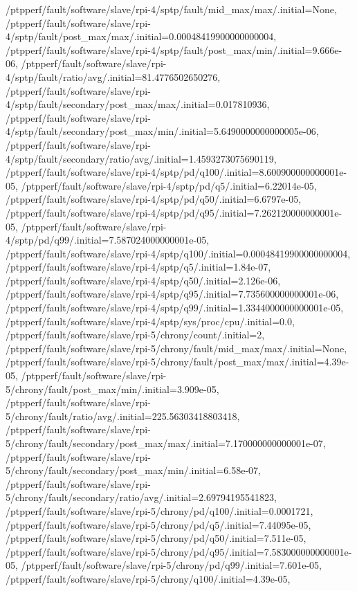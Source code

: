 {    /ptpperf/fault/software/slave/rpi-4/sptp/fault/mid_max/max/.initial=None,
    /ptpperf/fault/software/slave/rpi-4/sptp/fault/post_max/max/.initial=0.00048419900000000004,
    /ptpperf/fault/software/slave/rpi-4/sptp/fault/post_max/min/.initial=9.666e-06,
    /ptpperf/fault/software/slave/rpi-4/sptp/fault/ratio/avg/.initial=81.4776502650276,
    /ptpperf/fault/software/slave/rpi-4/sptp/fault/secondary/post_max/max/.initial=0.017810936,
    /ptpperf/fault/software/slave/rpi-4/sptp/fault/secondary/post_max/min/.initial=5.6490000000000005e-06,
    /ptpperf/fault/software/slave/rpi-4/sptp/fault/secondary/ratio/avg/.initial=1.4593273075690119,
    /ptpperf/fault/software/slave/rpi-4/sptp/pd/q100/.initial=8.600900000000001e-05,
    /ptpperf/fault/software/slave/rpi-4/sptp/pd/q5/.initial=6.22014e-05,
    /ptpperf/fault/software/slave/rpi-4/sptp/pd/q50/.initial=6.6797e-05,
    /ptpperf/fault/software/slave/rpi-4/sptp/pd/q95/.initial=7.262120000000001e-05,
    /ptpperf/fault/software/slave/rpi-4/sptp/pd/q99/.initial=7.587024000000001e-05,
    /ptpperf/fault/software/slave/rpi-4/sptp/q100/.initial=0.00048419900000000004,
    /ptpperf/fault/software/slave/rpi-4/sptp/q5/.initial=1.84e-07,
    /ptpperf/fault/software/slave/rpi-4/sptp/q50/.initial=2.126e-06,
    /ptpperf/fault/software/slave/rpi-4/sptp/q95/.initial=7.735600000000001e-06,
    /ptpperf/fault/software/slave/rpi-4/sptp/q99/.initial=1.3344000000000001e-05,
    /ptpperf/fault/software/slave/rpi-4/sptp/sys/proc/cpu/.initial=0.0,
    /ptpperf/fault/software/slave/rpi-5/chrony/count/.initial=2,
    /ptpperf/fault/software/slave/rpi-5/chrony/fault/mid_max/max/.initial=None,
    /ptpperf/fault/software/slave/rpi-5/chrony/fault/post_max/max/.initial=4.39e-05,
    /ptpperf/fault/software/slave/rpi-5/chrony/fault/post_max/min/.initial=3.909e-05,
    /ptpperf/fault/software/slave/rpi-5/chrony/fault/ratio/avg/.initial=225.56303418803418,
    /ptpperf/fault/software/slave/rpi-5/chrony/fault/secondary/post_max/max/.initial=7.170000000000001e-07,
    /ptpperf/fault/software/slave/rpi-5/chrony/fault/secondary/post_max/min/.initial=6.58e-07,
    /ptpperf/fault/software/slave/rpi-5/chrony/fault/secondary/ratio/avg/.initial=2.69794195541823,
    /ptpperf/fault/software/slave/rpi-5/chrony/pd/q100/.initial=0.0001721,
    /ptpperf/fault/software/slave/rpi-5/chrony/pd/q5/.initial=7.44095e-05,
    /ptpperf/fault/software/slave/rpi-5/chrony/pd/q50/.initial=7.511e-05,
    /ptpperf/fault/software/slave/rpi-5/chrony/pd/q95/.initial=7.583000000000001e-05,
    /ptpperf/fault/software/slave/rpi-5/chrony/pd/q99/.initial=7.601e-05,
    /ptpperf/fault/software/slave/rpi-5/chrony/q100/.initial=4.39e-05,
}
